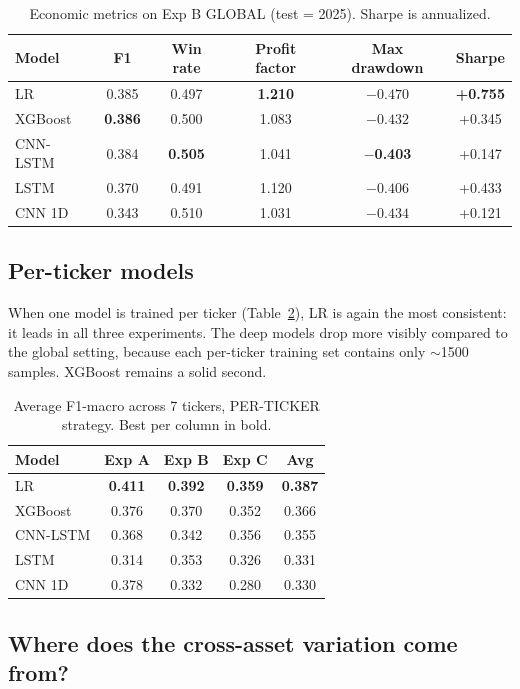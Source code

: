 \documentclass[runningheads]{llncs}
\begin{document}
\begin{table}[t]
\centering
\caption{Economic metrics on Exp B GLOBAL (test = 2025). Sharpe is annualized.}
\label{tab:econ_B}
\begin{tabular}{lccccc}
\toprule
Model & F1 & Win rate & Profit factor & Max drawdown & Sharpe \\
\midrule
LR & 0.385 & 0.497 & \textbf{1.210} & $-0.470$ & \textbf{+0.755} \\
XGBoost & \textbf{0.386} & 0.500 & 1.083 & $-0.432$ & +0.345 \\
CNN-LSTM & 0.384 & \textbf{0.505} & 1.041 & \textbf{$-$0.403} & +0.147 \\
LSTM & 0.370 & 0.491 & 1.120 & $-0.406$ & +0.433 \\
CNN 1D & 0.343 & 0.510 & 1.031 & $-0.434$ & +0.121 \\
\bottomrule
\end{tabular}
\end{table}

\subsection{Per-ticker models}

When one model is trained per ticker (Table~\ref{tab:f1_pt}), LR is again the most consistent: it leads in all three experiments. The deep models drop more visibly compared to the global setting, because each per-ticker training set contains only $\sim$1500 samples. XGBoost remains a solid second.

\begin{table}[t]
\centering
\caption{Average F1-macro across 7 tickers, PER-TICKER strategy. Best per column in bold.}
\label{tab:f1_pt}
\begin{tabular}{lcccc}
\toprule
Model & Exp A & Exp B & Exp C & Avg \\
\midrule
LR & \textbf{0.411} & \textbf{0.392} & \textbf{0.359} & \textbf{0.387} \\
XGBoost & 0.376 & 0.370 & 0.352 & 0.366 \\
CNN-LSTM & 0.368 & 0.342 & 0.356 & 0.355 \\
LSTM & 0.314 & 0.353 & 0.326 & 0.331 \\
CNN 1D & 0.378 & 0.332 & 0.280 & 0.330 \\
\bottomrule
\end{tabular}
\end{table}

\subsection{Where does the cross-asset variation come from?}
\end{document}
